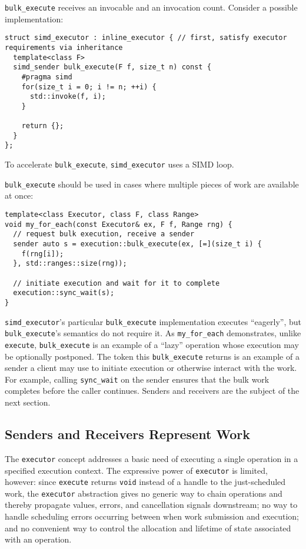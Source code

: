 \documentclass[a4paper,12pt,notitlepage,twoside,openright]{article}
\begin{document}
\texttt{bulk_execute} receives an invocable and an
invocation count. Consider a possible implementation:

\begin{verbatim}
struct simd_executor : inline_executor { // first, satisfy executor requirements via inheritance
  template<class F>
  simd_sender bulk_execute(F f, size_t n) const {
    #pragma simd
    for(size_t i = 0; i != n; ++i) {
      std::invoke(f, i);
    }

    return {};
  }
};
\end{verbatim}

To accelerate \texttt{bulk_execute},
\texttt{simd_executor} uses a SIMD loop.

\texttt{bulk_execute} should be used in cases where multiple
pieces of work are available at once:

\begin{verbatim}
template<class Executor, class F, class Range>
void my_for_each(const Executor& ex, F f, Range rng) {
  // request bulk execution, receive a sender
  sender auto s = execution::bulk_execute(ex, [=](size_t i) {
    f(rng[i]);
  }, std::ranges::size(rng));

  // initiate execution and wait for it to complete
  execution::sync_wait(s);
}
\end{verbatim}

\texttt{simd_executor}'s particular
\texttt{bulk_execute} implementation executes ``eagerly'',
but \texttt{bulk_execute}'s semantics do not require it. As
\texttt{my_for_each} demonstrates, unlike
\texttt{execute}, \texttt{bulk_execute} is an
example of a ``lazy'' operation whose execution may be optionally
postponed. The token this \texttt{bulk_execute} returns is
an example of a sender a client may use to initiate execution or
otherwise interact with the work. For example, calling
\texttt{sync_wait} on the sender ensures that the bulk work
completes before the caller continues. Senders and receivers are the
subject of the next section.

\hypertarget{senders-and-receivers-represent-work}{%
\subsection{Senders and Receivers Represent
Work}\label{senders-and-receivers-represent-work}}

The \texttt{executor} concept addresses a basic need of
executing a single operation in a specified execution context. The
expressive power of \texttt{executor} is limited, however:
since \texttt{execute} returns \texttt{void}
instead of a handle to the just-scheduled work, the
\texttt{executor} abstraction gives no generic way to chain
operations and thereby propagate values, errors, and cancellation
signals downstream; no way to handle scheduling errors occurring between
when work submission and execution; and no convenient way to control the
allocation and lifetime of state associated with an operation.
\end{document}
